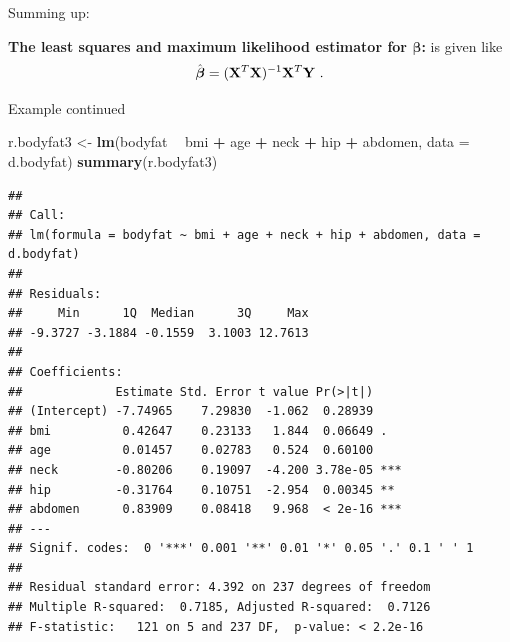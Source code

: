\documentclass[10pt,ignorenonframetext,]{beamer}
\newenvironment{Shaded}{\begin{snugshade}}{\end{snugshade}}
\newcommand{\KeywordTok}[1]{\textcolor[rgb]{0.13,0.29,0.53}{\textbf{#1}}}
\newcommand{\DataTypeTok}[1]{\textcolor[rgb]{0.13,0.29,0.53}{#1}}
\newcommand{\StringTok}[1]{\textcolor[rgb]{0.31,0.60,0.02}{#1}}
\newcommand{\OperatorTok}[1]{\textcolor[rgb]{0.81,0.36,0.00}{\textbf{#1}}}
\newcommand{\NormalTok}[1]{#1}
\begin{document}
\begin{frame}

Summing up:

\textbf{The least squares and maximum likelihood estimator for ${\boldsymbol \beta}$:}
is given like
\[ \hat{\boldsymbol\beta}=({\bf X}^T{\bf X})^{-1} {\bf X}^T {\bf Y} \ .\]

\end{frame}

\begin{frame}[fragile]

\begin{block}{Example continued}

\tiny

\begin{Shaded}
\begin{Highlighting}[]
\NormalTok{r.bodyfat3 <-}\StringTok{ }\KeywordTok{lm}\NormalTok{(bodyfat }\OperatorTok{~}\StringTok{ }\NormalTok{bmi }\OperatorTok{+}\StringTok{ }\NormalTok{age }\OperatorTok{+}\StringTok{ }\NormalTok{neck }\OperatorTok{+}\StringTok{ }\NormalTok{hip }\OperatorTok{+}\StringTok{ }\NormalTok{abdomen, }\DataTypeTok{data =}\NormalTok{ d.bodyfat)}
\KeywordTok{summary}\NormalTok{(r.bodyfat3)}
\end{Highlighting}
\end{Shaded}

\begin{verbatim}
## 
## Call:
## lm(formula = bodyfat ~ bmi + age + neck + hip + abdomen, data = d.bodyfat)
## 
## Residuals:
##     Min      1Q  Median      3Q     Max 
## -9.3727 -3.1884 -0.1559  3.1003 12.7613 
## 
## Coefficients:
##             Estimate Std. Error t value Pr(>|t|)    
## (Intercept) -7.74965    7.29830  -1.062  0.28939    
## bmi          0.42647    0.23133   1.844  0.06649 .  
## age          0.01457    0.02783   0.524  0.60100    
## neck        -0.80206    0.19097  -4.200 3.78e-05 ***
## hip         -0.31764    0.10751  -2.954  0.00345 ** 
## abdomen      0.83909    0.08418   9.968  < 2e-16 ***
## ---
## Signif. codes:  0 '***' 0.001 '**' 0.01 '*' 0.05 '.' 0.1 ' ' 1
## 
## Residual standard error: 4.392 on 237 degrees of freedom
## Multiple R-squared:  0.7185, Adjusted R-squared:  0.7126 
## F-statistic:   121 on 5 and 237 DF,  p-value: < 2.2e-16
\end{verbatim}

\normalsize

\end{block}

\end{frame}
\end{document}
